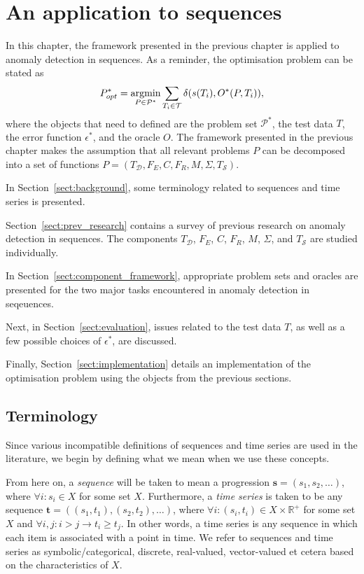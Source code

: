 \chapter{An application to sequences}
\label{ch:time_series}

In this chapter, the framework presented in the previous chapter is applied to anomaly detection in sequences. As a reminder, the optimisation problem can be stated as
\[
    P^*_{opt} = \argmin_{P \in \mathcal{P}^*} \sum_{T_i \in \mathcal{T}} \delta(s(T_i), O^*(P, T_i)),
\]
where the objects that need to defined are the problem set $\mathcal{P}^*$, the test data $T$, the error function $\epsilon^*$, and the oracle $O$. The framework presented in the previous chapter makes the assumption that all relevant problems $P$ can be decomposed into a set of functions $P = (T_{\mathcal{D}}, F_E, C, F_R, M, \Sigma, T_{\mathcal{S}})$.

In Section~\ref{sect:background}, some terminology related to sequences and time series is presented.

Section~\ref{sect:prev_research} contains a survey of previous research on anomaly detection in sequences. The components $T_{\mathcal{D}}$, $F_E$, $C$, $F_R$, $M$, $\Sigma$, and $T_{\mathcal{S}}$ are studied individually.

In Section~\ref{sect:component_framework}, appropriate problem sets and oracles are presented for the two major tasks encountered in anomaly detection in seqeuences.

Next, in Section~\ref{sect:evaluation}, issues related to the test data $T$, as well as a few possible choices of $\epsilon^*$, are discussed.

Finally, Section~\ref{sect:implementation} details an implementation of the optimisation problem using the objects from the previous sections.

\section{Terminology}
\label{sect:terminology}

Since various incompatible definitions of sequences and time series are used in the literature, we begin by defining what we mean when we use these concepts.

From here on, a \emph{sequence} will be taken to mean a progression $\mathbf{s} = (s_1, s_2, \dots)$, where $\forall i: s_i \in X$ for some set $X$. Furthermore, a \emph{time series} is taken to be any sequence $\mathbf{t} = ((s_1, t_1), (s_2, t_2), \dots)$, where $\forall i: (s_i, t_i) \in X \times \mathbb{R}^+$ for some set $X$ and $\forall i, j: i > j \rightarrow t_i \geq t_j$. In other words, a time series is any sequence in which each item is associated with a point in time. We refer to sequences and time series as symbolic/categorical, discrete, real-valued, vector-valued et cetera based on the characteristics of $X$.

